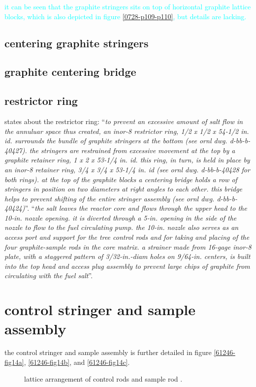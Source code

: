 \documentclass{article}
\begin{document}
\begin{preview}
\textcolor{cyan}{it can be seen that the graphite stringers sits on top of horizontal graphite lattice blocks, which is also depicted in figure \ref{0728-p109-p110}, but details are lacking.}

\subsection{centering graphite stringers}

\subsection{graphite centering bridge}

\subsection{restrictor ring}
\parencite[page 84-85]{ornl-tm-0728} states about the restrictor ring:
\enquote{\textit{to prevent an excessive amount of salt flow in the annuluar space thus created, an inor-8 restrictor ring, 1/2 x 1/2 x 54-1/2 in. id. surrounds the bundle of graphite stringers at the bottom (see ornl dwg. d-bb-b-40427). the stringers are restrained from excessive movement at the top by a graphite retainer ring, 1 x 2 x 53-1/4 in. id. this ring, in turn, is held in place by an inor-8 retainer ring, 3/4 x 3/4 x 53-1/4 in. id (see ornl dwg. d-bb-b-40428 for both rings). at the top of the graphite blocks a centering bridge holds a row of stringers in position on two diameters at right angles to each other. this bridge helps to prevent shifting of the entire stringer assembly (see ornl dwg. d-bb-b-40424)}}.
\enquote{\textit{the salt leaves the reactor core and flows through the upper head to the 10-in. nozzle opening. it is diverted through a 5-in. opening in the side of the nozzle to flow to the fuel circulating pump. the 10-in. nozzle also serves as an access port and support for the tree control rods and for taking and placing of the four graphite-sample rods in the core matrix. a strainer made from 16-gage inor-8 plate, with a staggered pattern of 3/32-in.-diam holes on 9/64-in. centers, is built into the top head and access plug assembly to prevent large chips of graphite from circulating with the fuel salt}}.




\section{control stringer and sample assembly}
the control stringer and sample assembly is further detailed in figure \ref{61246-fig14a}, \ref{61246-fig14b}, and \ref{61246-fig14c}.
\begin{figure}[H]
  \centering
  \caption{lattice arrangement of control rods and sample rod \parencite[figure 5.7]{tm-0728}.}
  \label{0728-fig5-7}
\end{figure}


\end{preview}
\end{document}
